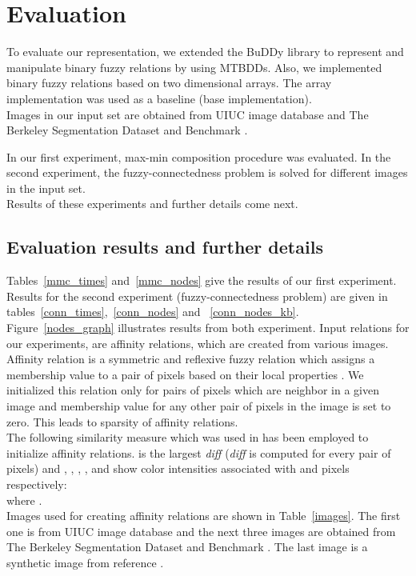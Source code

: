 \documentclass[4pt]{article}
\begin{document}
\section{Evaluation}
\label{evaluation}

To evaluate our representation, we extended the BuDDy library to represent and manipulate binary fuzzy relations by using MTBDDs. Also, we implemented binary fuzzy relations based on two dimensional arrays. The array implementation was used as a baseline (base implementation).\\
Images in our input set are obtained from UIUC image database \cite{uiuc_bench} and The Berkeley Segmentation Dataset and Benchmark \cite{berk_bench}.

In our first experiment, max-min composition procedure was evaluated. In the second experiment, the fuzzy-connectedness problem is solved for different images in the input set.\\
Results of these experiments and further details come next.

\subsection{Evaluation results and further details}

Tables~\ref{mmc_times} and~\ref{mmc_nodes} give the results of our first experiment. Results for the second experiment (fuzzy-connectedness problem) are given in tables~\ref{conn_times},~\ref{conn_nodes} and ~\ref{conn_nodes_kb}. Figure~\ref{nodes_graph} illustrates results from both experiment. Input relations for our experiments, are affinity relations, which are created from various images. Affinity relation is a symmetric and reflexive fuzzy relation which assigns a membership value to a pair of pixels based on their local properties \cite{conn}. We initialized this relation only for pairs of pixels which are neighbor in a given image and membership value for any other pair of pixels in the image is set to zero. This leads to sparsity of affinity relations.\\
The following similarity measure which was used in \cite{graph_seg} has been employed to initialize affinity relations.  is the largest \textit{diff} (\textit{diff} is computed for every pair of pixels) and , , , ,  and  show color intensities associated with  and  pixels respectively:\\ 
 where .\\
Images  used for creating affinity relations are shown in Table~\ref{images}. The first one is from UIUC image database \cite{uiuc_bench} and the next three images are obtained from The Berkeley Segmentation Dataset and Benchmark \cite{berk_bench}. The last image is a synthetic image from reference \cite{graph_seg}.
\end{document}
